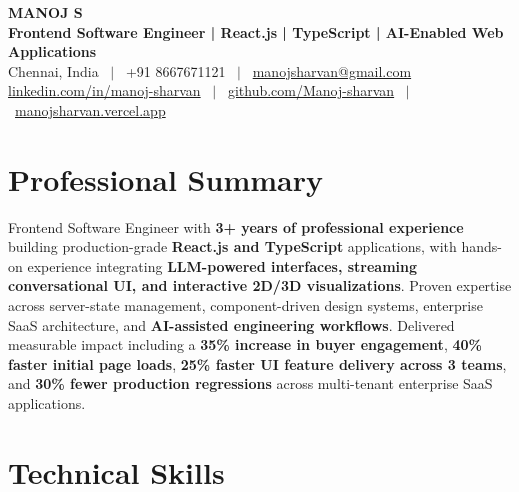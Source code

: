 \documentclass[letterpaper,10pt]{article}
\begin{document}

\begin{center}
  {\LARGE \textbf{MANOJ S}}\\[2pt]
  \textbf{Frontend Software Engineer | React.js | TypeScript | AI-Enabled Web Applications}\\[3pt]
  Chennai, India \ $|$ \ +91 8667671121 \ $|$ \ \href{mailto:manojsharvan@gmail.com}{manojsharvan@gmail.com}\\[1pt]
  \href{https://linkedin.com/in/manoj-sharvan}{linkedin.com/in/manoj-sharvan} \ $|$ \ \href{https://github.com/Manoj-sharvan}{github.com/Manoj-sharvan} \ $|$ \ \href{https://manojsharvan.vercel.app}{manojsharvan.vercel.app}
\end{center}

\vspace{-3pt}


\section{Professional Summary}

Frontend Software Engineer with \textbf{3+ years of professional experience} building production-grade \textbf{React.js and TypeScript} applications, with hands-on experience integrating \textbf{LLM-powered interfaces, streaming conversational UI, and interactive 2D/3D visualizations}. Proven expertise across server-state management, component-driven design systems, enterprise SaaS architecture, and \textbf{AI-assisted engineering workflows}. Delivered measurable impact including a \textbf{35\% increase in buyer engagement}, \textbf{40\% faster initial page loads}, \textbf{25\% faster UI feature delivery across 3 teams}, and \textbf{30\% fewer production regressions} across multi-tenant enterprise SaaS applications.


\section{Technical Skills}
\end{document}
